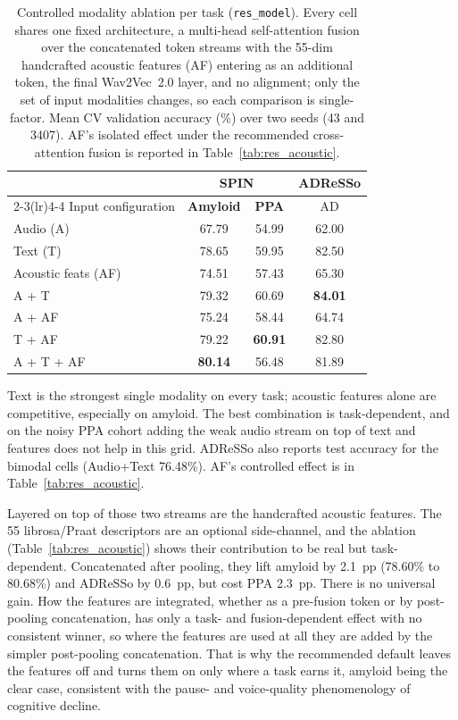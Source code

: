 \begin{table}[htbp]
\centering
\caption[Controlled modality ablation per task]{Controlled modality ablation per task (\texttt{res\_model}). Every cell shares one fixed architecture, a multi-head self-attention fusion over the concatenated token streams with the 55-dim handcrafted acoustic features (AF) entering as an additional token, the final Wav2Vec~2.0 layer, and no alignment; only the set of input modalities changes, so each comparison is single-factor. Mean CV validation accuracy (\%) over two seeds (43 and 3407). AF's isolated effect under the recommended cross-attention fusion is reported in Table~\ref{tab:res_acoustic}.}
\label{tab:res_modality}
\small
\begin{tabular}{lccc}
\toprule
 & \multicolumn{2}{c}{\textbf{SPIN}} & \textbf{ADReSSo} \\
\cmidrule(lr){2-3}\cmidrule(lr){4-4}
Input configuration & \textbf{Amyloid} & \textbf{PPA} & AD \\
\midrule
Audio (A)         & 67.79 & 54.99 & 62.00 \\
Text (T)          & 78.65 & 59.95 & 82.50 \\
Acoustic feats (AF) & 74.51 & 57.43 & 65.30 \\
A + T             & 79.32 & 60.69 & \textbf{84.01} \\
A + AF            & 75.24 & 58.44 & 64.74 \\
T + AF            & 79.22 & \textbf{60.91} & 82.80 \\
A + T + AF        & \textbf{80.14} & 56.48 & 81.89 \\
\bottomrule
\end{tabular}

\vspace{2pt}
{\footnotesize Text is the strongest single modality on every task; acoustic features alone are competitive, especially on amyloid. The best combination is task-dependent, and on the noisy PPA cohort adding the weak audio stream on top of text and features does not help in this grid. ADReSSo also reports test accuracy for the bimodal cells (Audio+Text 76.48\%). AF's controlled effect is in Table~\ref{tab:res_acoustic}.}
\end{table}

Layered on top of those two streams are the handcrafted acoustic features. The 55 librosa/Praat descriptors are an optional side-channel, and the ablation (Table~\ref{tab:res_acoustic}) shows their contribution to be real but task-dependent. Concatenated after pooling, they lift amyloid by 2.1~pp (78.60\% to 80.68\%) and ADReSSo by 0.6~pp, but cost PPA 2.3~pp. There is no universal gain. How the features are integrated, whether as a pre-fusion token or by post-pooling concatenation, has only a task- and fusion-dependent effect with no consistent winner, so where the features are used at all they are added by the simpler post-pooling concatenation. That is why the recommended default leaves the features off and turns them on only where a task earns it, amyloid being the clear case, consistent with the pause- and voice-quality phenomenology of cognitive decline.


